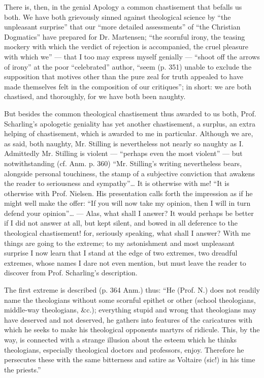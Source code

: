 \documentclass[12pt,a4paper,openany]{book}
\newcommand{\opage}[1]{\marginnote{\footnotesize\textit{[#1]}}}
\begin{document}
There is, then, in the genial Apology a common chastisement
that befalls us both. We have both grievously
sinned against theological science by ``the unpleasant
surprise'' that our ``more detailed assessments'' of
``the Christian Dogmatics'' have prepared for Dr. Martensen;
``the scornful irony, the teasing mockery with which the verdict of rejection
is accompanied, the cruel pleasure with which
we'' --- that I too may express myself genially --- ``shoot off the arrows of irony'' at the poor ``celebrated'' author,
``seem (p. 351) unable to exclude the supposition
that motives other than the pure zeal for truth appealed to
have made themselves felt in the composition of our
critiques''; in short: we are both chastised, and
thoroughly, for we have both been naughty.

But besides the common theological chastisement thus
awarded to us both, Prof. Scharling's apologetic geniality has yet another chastisement, a surplus, an
extra helping of chastisement, which is awarded to me in particular. Although we
are, as said, both naughty, Mr. Stilling is nevertheless
not nearly so naughty as I. Admittedly Mr.
Stilling is violent --- ``perhaps even the most violent'' ---
but notwithstanding (cf. Anm. p. 360) ``Mr.
Stilling's writing nevertheless bears, alongside personal touchiness,
the stamp of a subjective conviction that awakens the reader
to seriousness and sympathy''\dots{} It is otherwise with
me! ``It is otherwise with Prof. Nielsen. His
presentation calls forth the impression as if he might well
\setcounter{footnote}{0}%
\opage{6}make the offer: ``If you will now take my opinion, then
I will in turn defend your opinion''\dots{} --- Alas, what shall
I answer? It would perhaps be better if I did not answer at all,
but kept silent, and bowed in all deference
to the theological chastisement! for, seriously speaking, what shall
I answer? With me things are going to the extreme; to my
astonishment and most unpleasant surprise I now learn
that I stand at the edge of two extremes,
two dreadful extremes, whose names I dare not even
mention, but must leave the reader to discover from Prof.
Scharling's description.

The first extreme is described (p. 364 Anm.) thus:
``He (Prof. N.) does not readily name the theologians
without some scornful epithet or other (school theologians,
middle-way theologians, \&c.); everything stupid and wrong
that theologians may have deserved and not deserved,
he gathers into features of the caricatures with which he seeks
to make his theological opponents martyrs of ridicule.
This, by the way, is connected with a strange
illusion about the esteem which he thinks
theologians, especially theological doctors and professors, enjoy.
Therefore he persecutes these with the same bitterness and
satire as Voltaire (sic!) in his time the priests.''
\end{document}
